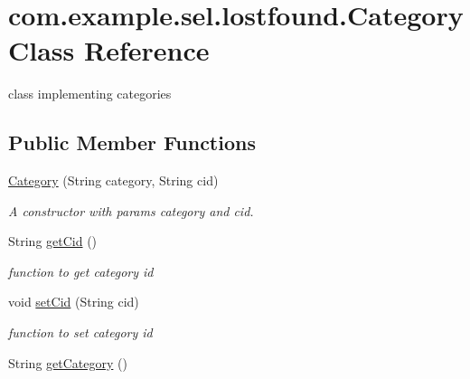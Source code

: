 \hypertarget{classcom_1_1example_1_1sel_1_1lostfound_1_1Category}{}\section{com.\+example.\+sel.\+lostfound.\+Category Class Reference}
\label{classcom_1_1example_1_1sel_1_1lostfound_1_1Category}


class implementing categories  


\subsection*{Public Member Functions}
\begin{DoxyCompactItemize}
\item 
\hyperlink{classcom_1_1example_1_1sel_1_1lostfound_1_1Category_a01e1a68dd2639ab6bee0007cc1dcf294}{Category} (String category, String cid)
\begin{DoxyCompactList}\small\item\em A constructor with params category and cid. \end{DoxyCompactList}\item 
String \hyperlink{classcom_1_1example_1_1sel_1_1lostfound_1_1Category_a9394ecafd86528fa00554aecbc76ebdb}{get\+Cid} ()\hypertarget{classcom_1_1example_1_1sel_1_1lostfound_1_1Category_a9394ecafd86528fa00554aecbc76ebdb}{}\label{classcom_1_1example_1_1sel_1_1lostfound_1_1Category_a9394ecafd86528fa00554aecbc76ebdb}

\begin{DoxyCompactList}\small\item\em function to get category id \end{DoxyCompactList}\item 
void \hyperlink{classcom_1_1example_1_1sel_1_1lostfound_1_1Category_ae020ac053079f77939440df880c105d7}{set\+Cid} (String cid)\hypertarget{classcom_1_1example_1_1sel_1_1lostfound_1_1Category_ae020ac053079f77939440df880c105d7}{}\label{classcom_1_1example_1_1sel_1_1lostfound_1_1Category_ae020ac053079f77939440df880c105d7}

\begin{DoxyCompactList}\small\item\em function to set category id \end{DoxyCompactList}\item 
String \hyperlink{classcom_1_1example_1_1sel_1_1lostfound_1_1Category_aad1c1ed95ef449791e1e27725ed60314}{get\+Category} ()\hypertarget{classcom_1_1example_1_1sel_1_1lostfound_1_1Category_aad1c1ed95ef449791e1e27725ed60314}{}\label{classcom_1_1example_1_1sel_1_1lostfound_1_1Category_aad1c1ed95ef449791e1e27725ed60314}


\end{DoxyCompactItemize}
